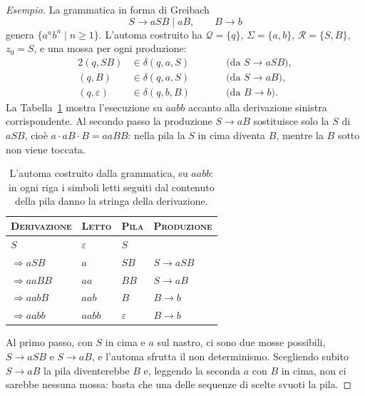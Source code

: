 \documentclass[a4paper, 11pt, oneside]{book}
\theoremstyle{formale}
\newenvironment{esempio}
    {\begin{proof}[\textit{Esempio}]\renewcommand{\qedsymbol}{$\diamond$}}
    {\end{proof}}
\begin{document}
    \begin{esempio}
        La grammatica in forma di Greibach
        \begin{equation*}
            S \to aSB \mid aB, \qquad B \to b
        \end{equation*}
        genera $\{a^n b^n \mid n \geq 1\}$. L'automa costruito ha $\mathcal{Q} = \{q\}$,
        $\Sigma = \{a, b\}$, $\mathcal{R} = \{S, B\}$, $z_0 = S$, e una mossa per ogni
        produzione:
        \begin{alignat*}{2}
            (q, SB) &\in \delta(q, a, S) & \qquad & \text{(da $S \to aSB$)}, \\
            (q, B) &\in \delta(q, a, S) & & \text{(da $S \to aB$)}, \\
            (q, \varepsilon) &\in \delta(q, b, B) & & \text{(da $B \to b$)}.
        \end{alignat*}
        La Tabella~\ref{tab:greibach-aabb} mostra l'esecuzione su $aabb$ accanto alla
        derivazione sinistra corrispondente. Al secondo passo la produzione $S \to aB$
        sostituisce solo la $S$ di $aSB$, cio\`e $a \cdot aB \cdot B = aaBB$: nella pila
        la $S$ in cima diventa $B$, mentre la $B$ sotto non viene toccata.

        \begin{table}[H]
            \centering
            \begin{tabular}{llll}
                \toprule
                \textsc{Derivazione} & \textsc{Letto} & \textsc{Pila}
                    & \textsc{Produzione} \\
                \midrule
                $S$ & $\varepsilon$ & $S$ & \\
                $\Rightarrow aSB$ & $a$ & $SB$ & $S \to aSB$ \\
                $\Rightarrow aaBB$ & $aa$ & $BB$ & $S \to aB$ \\
                $\Rightarrow aabB$ & $aab$ & $B$ & $B \to b$ \\
                $\Rightarrow aabb$ & $aabb$ & $\varepsilon$ & $B \to b$ \\
                \bottomrule
            \end{tabular}
            \caption{L'automa costruito dalla grammatica, su $aabb$: in ogni riga i
                simboli letti seguiti dal contenuto della pila danno la stringa della
                derivazione.}
            \label{tab:greibach-aabb}
        \end{table}

        Al primo passo, con $S$ in cima e $a$ sul nastro, ci sono due mosse possibili,
        $S \to aSB$ e $S \to aB$, e l'automa sfrutta il non determinismo. Scegliendo
        subito $S \to aB$ la pila diventerebbe $B$ e, leggendo la seconda $a$ con $B$ in
        cima, non ci sarebbe nessuna mossa: basta che una delle sequenze di scelte
        svuoti la pila.
    \end{esempio}
\end{document}
